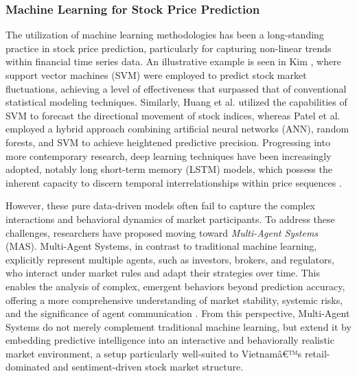 \documentclass{ieeeaccess}
\begin{document}
\subsubsection{Machine Learning for Stock Price Prediction}
The utilization of machine learning methodologies has been a long-standing practice in stock price prediction, particularly for capturing non-linear trends within financial time series data. An illustrative example is seen in Kim \cite{kim2003}, where support vector machines (SVM) were employed to predict stock market fluctuations, achieving a level of effectiveness that surpassed that of conventional statistical modeling techniques. Similarly, Huang et al. \cite{huang2005} utilized the capabilities of SVM to forecast the directional movement of stock indices, whereas Patel et al. \cite{patel2015} employed a hybrid approach combining artificial neural networks (ANN), random forests, and SVM to achieve heightened predictive precision. Progressing into more contemporary research, deep learning techniques have been increasingly adopted, notably long short-term memory (LSTM) models, which possess the inherent capacity to discern temporal interrelationships within price sequences \cite{fischer2018,chen2015}.

However, these pure data-driven models often fail to capture the complex interactions and behavioral dynamics of market participants. To address these challenges, researchers have proposed moving toward \textit{Multi-Agent Systems} (MAS). Multi-Agent Systems, in contrast to traditional machine learning, explicitly represent multiple agents, such as investors, brokers, and regulators, who interact under market rules and adapt their strategies over time. This enables the analysis of complex, emergent behaviors beyond prediction accuracy, offering a more comprehensive understanding of market stability, systemic risks, and the significance of agent communication \cite{lebaron2006,chen2012,tesfatsion2006,wang2021}. From this perspective, Multi-Agent Systems do not merely complement traditional machine learning, but extend it by embedding predictive intelligence into an interactive and behaviorally realistic market environment, a setup particularly well-suited to Vietnamâ€™s retail-dominated and sentiment-driven stock market structure.
\end{document}
